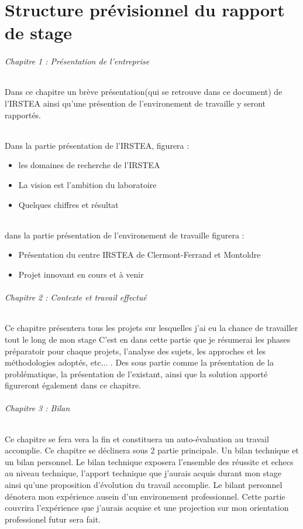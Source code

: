 \part{Structure prévisionnel du rapport de stage}
\paragraph{Chapitre 1 : Présentation de l'entreprise}
Dans ce chapitre un brève présentation(qui se retrouve dans ce document) de l'IRSTEA ainsi qu'une présention de l'environement de travaille y seront rapportés.
\paragraph{}
Dans la partie présentation de l'IRSTEA, figurera  : 
\begin{itemize}
 \item les domaines de recherche de l'IRSTEA
 \item La vision est l'ambition du laboratoire
 \item Quelques chiffres et résultat
 \end{itemize}
\paragraph{}
dans la partie présentation de l'environement de travaille figurera : 
\begin{itemize}
 \item Présentation du centre IRSTEA de Clermont-Ferrand et Montoldre
 \item Projet innovant en cours et à venir
 \end{itemize}



\paragraph{Chapitre 2 : Contexte et travail effectué}
Ce chapitre présentera tous les projets sur lesquelles j'ai eu la chance de travailler tout le long de mon stage
C'est en dans cette partie que je résumerai les phases préparatoir pour chaque projets, l'analyse des sujets, les approches et les méthodologies adoptés, etc... . Des sous partie comme la présentation de la problématique, la présentation de l'existant, ainsi que la solution apporté figureront également dans ce chapitre.

\paragraph{Chapitre 3 : Bilan}
Ce chapitre se fera vera la fin et constituera un auto-évaluation au travail accomplie. Ce chapitre se déclinera sous 2 partie principale. Un bilan technique et un bilan personnel. Le bilan technique exposera l'ensemble des réussite et echecs au niveau technique, l'apport technique que j'aurais acquis durant mon stage ainsi qu'une proposition d'évolution du travail accomplie. Le bilant personnel dénotera mon expérience ausein d'un environement professionnel. Cette partie couvrira l'expérience que j'aurais acquise et une projection sur mon orientation professionel futur sera fait.






